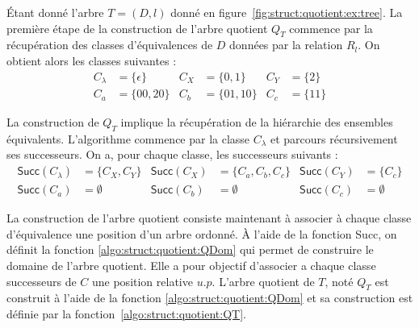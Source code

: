 \begin{example}
    \label{ex:struct:quotient:1}
    Étant donné l'arbre $T = (D, l)$ donné en figure~\ref{fig:struct:quotient:ex:tree}.
    La première étape de la construction de l'arbre quotient $Q_T$ commence par la récupération des classes d'équivalences de $D$ données par la relation $R_l$.
    On obtient alors les classes suivantes :
    \begin{align*}
        C_\lambda & = \{\epsilon\} & C_X & = \{0, 1\}   & C_Y & = \{2\}  \\
        C_a       & = \{00, 20\}   & C_b & = \{01, 10\} & C_c & = \{11\}
    \end{align*}

    La construction de $Q_T$ implique la récupération de la hiérarchie des ensembles équivalents.
    L'algorithme commence par la classe $C_\lambda$ et parcours récursivement ses successeurs.
    On a, pour chaque classe, les successeurs suivants :
    \begin{align*}
        \textsf{Succ}(C_\lambda) & = \{C_X, C_Y\} & \textsf{Succ}(C_X) & = \{C_a, C_b, C_c\} & \textsf{Succ}(C_Y) & = \{C_c\}   \\
        \textsf{Succ}(C_a)       & = \emptyset    & \textsf{Succ}(C_b) & = \emptyset         & \textsf{Succ}(C_c) & = \emptyset
    \end{align*}
\end{example}

La construction de l'arbre quotient consiste maintenant à associer à chaque classe d'équivalence une position d'un arbre ordonné.
À l'aide de la fonction \textsf{Succ}, on définit la fonction \ref{algo:struct:quotient:QDom} qui permet de construire le domaine de l'arbre quotient.
Elle a pour objectif d'associer a chaque classe successeurs de $C$ une position relative $u.p$.
L'arbre quotient de $T$, noté $Q_T$ est construit à l'aide de la fonction \ref{algo:struct:quotient:QDom} et sa construction est définie par la fonction~\ref{algo:struct:quotient:QT}.\\


